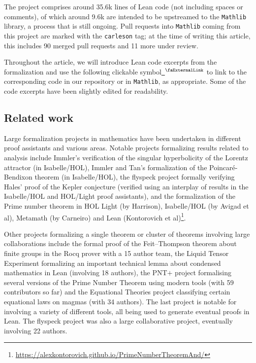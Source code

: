 \documentclass[12pt]{amsart}
\newcommand{\lean}[1]{\lstinline{#1}}
\newcommand{\mathlib}{\texttt{Mathlib}\xspace}
\newcommand{\extlink}{~\ensuremath{{}^\text{\faExternalLink}}}
\theoremstyle{definition}
\theoremstyle{plain}
\begin{document}
The project comprises around 35.6k lines of Lean code (not including spaces or comments), of which around 9.6k are intended to be upstreamed to the \mathlib library, a process that is still ongoing. Pull requests into \mathlib coming from this project are marked with the \lean{carleson} tag; at the time of writing this article, this includes 90 merged pull requests and 11 more under review.

Throughout the article, we will introduce Lean code excerpts from the formalization and use the following clickable symbol\href{https://github.com/fpvandoorn/carleson/blob/020d6e5c71d731952eb0379d222eea4049103ca0/Carleson/Defs.lean#L298}{\extlink} to link to the corresponding code in our repository or in \mathlib, as appropriate. Some of the code excerpts have been slightly edited for readability.

\subsection{Related work}\label{subsec:rel_work}

Large formalization projects in mathematics have been undertaken in different proof assistants and various areas.
Notable projects formalizing results related to analysis include Immler's verification of the singular hyperbolicity of the Lorentz attractor \cite{ImmlerLorentzSolver} (in Isabelle/HOL),
Immler and Tan's formalization of the Poincaré-Bendixon theorem \cite{ImmlerTanPoincareBendixon} (in Isabelle/HOL),
the flyspeck project \cite{FlyspeckComplete} formally verifying Hales' proof of the Kepler conjecture (verified using an interplay of results in the Isabelle/HOL and HOL/Light proof assistants), and the formalization of the Prime number theorem in HOL Light \cite{HarrisonPNT} (by Harrison), Isabelle/HOL \cite{AvigadPNT} (by Avigad et al), Metamath \cite{CarneiroPNT} (by Carneiro) and Lean (Kontorovich et al)\footnote{\url{https://alexkontorovich.github.io/PrimeNumberTheoremAnd/}}.

Other projects formalizing a single theorem or cluster of theorems involving large collaborations include the formal proof of the Feit--Thompson theorem about finite groups in the Rocq prover \cite{OddOrderTheorem} with a 15 author team, the Liquid Tensor Experiment formalizing an important technical lemma about condensed mathematics in Lean \cites{LTEDefinitions,LTEFinal} (involving 18 authors), the PNT$+$ project formalising several versions of the Prime Number Theorem using modern tools (with 59 contributors so far) %
and the Equational Theories project classifying certain equational laws on magmas \cite{tao2025equationaltheories} (with 34 authors).
The last project is notable for involving a variety of different tools, %
all being used to generate eventual proofs in Lean.
The flyspeck project was also a large collaborative project, eventually involving 22 authors.
\end{document}
